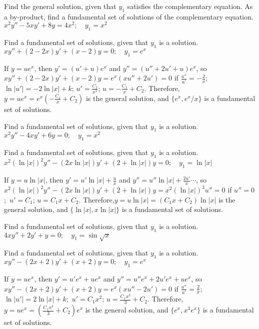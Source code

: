 \documentclass{ximera}
\begin{document}
\begin{problem}\label{exer:5.6.17}
Find the general solution,
given that $y_1$ satisfies the complementary equation. As a by-product,
find a fundamental set of solutions of the complementary equation. $x^2y''-5xy'+8y=4x^2;  \quad y_1=x^2$
\end{problem}

\begin{problem}\label{exer:5.6.18} Find a
fundamental set of solutions, given that $y_1$ is a solution. $xy''+(2-2x)y'+(x-2)y=0;    \quad y_1=e^x$

\begin{solution}
    If $y=ue^x$, then $y'=(u'+u)e^x$ and $y''=(u''+2u'+u)e^x$, so
$xy''+(2-2x)y'+(x-2)y=e^x(xu''+2u')=0$ if $\frac{u''}{
u'}=-\frac{2}{ x}$;\ $\ln|u'|=-2\ln|x|+k$; $u'=\frac{C_1}{ x^2}$;\;
$u=-\frac{C_1}{ x}+C_2$. Therefore,$y=ue^x=e^x\left(-\frac{C_1}{
x}+C_2\right)$ is the general solution, and $\{e^x,e^x/x\}$ is a
fundamental set of solutions.
\end{solution}
\end{problem}

\begin{problem}\label{exer:5.6.19}
Find a
fundamental set of solutions, given that $y_1$ is a solution. $x^2y''-4xy'+6y=0;   \quad y_1=x^2$
\end{problem}

\begin{problem}\label{exer:5.6.20}
Find a
fundamental set of solutions, given that $y_1$ is a solution. $x^2(\ln |x|)^2y''-(2x \ln |x|)y'+(2+\ln |x|)y=0;   \quad y_1=\ln |x|$

\begin{solution}
    If $y=u\ln|x|$, then $y'=u'\ln|x|+\frac{u}{ x}$ and
$y''=u''\ln|x|+\frac{2u'}{ x}\cdots$, so $x^2(\ln |x|)^2y''-(2x \ln
|x|)y'+(2+\ln |x|)y=x^2(\ln|x|)^3u''=0$ if $u''=0$;\ $u'=C_1$;\;
$u=C_1x+C_2$. Therefore,$y=u\ln|x|=(C_1x+C_2)\ln|x|$ is the general
solution, and $\{\ln|x|,x\ln|x|\}$ is a fundamental set of solutions.
\end{solution}
\end{problem}

\begin{problem}\label{exer:5.6.21}
Find a
fundamental set of solutions, given that $y_1$ is a solution. $4xy''+2y'+y=0;  \quad y_1=\sin \sqrt{x}$
\end{problem}

\begin{problem}\label{exer:5.6.22}
Find a
fundamental set of solutions, given that $y_1$ is a solution. $xy''-(2x+2)y'+(x+2)y=0;   \quad y_1=e^x$

\begin{solution}
    If $y=ue^x$, then $y'=u'e^x+ue^x$ and $y''=u''e^x+2u'e^x+ue^x$, so
$xy''-(2x+2)y'+(x+2)y=e^x(xu''-2u')=0$ if $\frac{u''}{
u'}=\frac{2}{ x}$;\ $\ln|u'|=2\ln|x|+k$;\ $u'=C_1x^2$;\;
$u=\frac{C_1x^3}{3}+C_2$. Therefore,
$y=ue^x=\left(\frac{C_1x^3}{3}+C_2\right)e^x$ is the general
solution, and $\{e^x,x^3e^x\}$ is a fundamental set of solutions.

\end{solution}
\end{problem}
\end{document}
